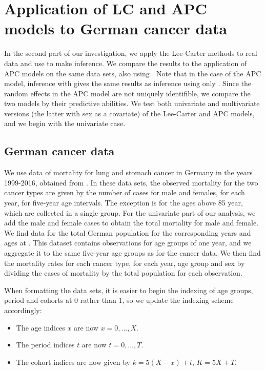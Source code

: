 \newpage
\section{Application of LC and APC models to German cancer data}
\label{sec:real-data}
In the second part of our investigation, we apply the Lee-Carter methods to real data and use \inlabru to make inference. We compare the results to the application of APC models on the same data sets, also using \inlabru. Note that in the case of the APC model, inference with \inlabru gives the same results as inference using only \inla. Since the random effects in the APC model are not uniquely identifible, we compare the two models by their predictive abilities. We test both univariate and multivariate versions (the latter with sex as a covariate) of the Lee-Carter and APC models, and we begin with the univariate case. 
\subsection{German cancer data}
\label{sec:GermanCancerData}
We use data of mortality for lung and stomach cancer in Germany in the years 1999-2016, obtained from . In these data sets, the observed mortality for the two cancer types are given by the number of cases for male and females, for each year, for five-year age intervals. The exception is for the ages above 85 year, which are collected in a single group. For the univariate part of our analysis, we add the male and female cases to obtain the total mortality for male and female. We find data for the total German population for the corresponding years and ages at . This dataset contains observations for age groups of one year, and we aggregate it to the same five-year age groups as for the cancer data. We then find the mortality rates for each cancer type, for each year, age group and sex by dividing the cases of mortality by the total population for each observation. 

\newpar When formatting the data sets, it is easier to begin the indexing of age groups, period and cohorts at 0 rather than 1, so we update the indexing scheme accordingly:
\begin{itemize}
    \item The age indices $x$ are now $x = 0,\ldots,X$.
    \item The period indices $t$ are now $t = 0, \ldots, T$.
    \item The cohort indices are now given by $k = 5(X - x) + t$, $K = 5X + T$.
\end{itemize}

